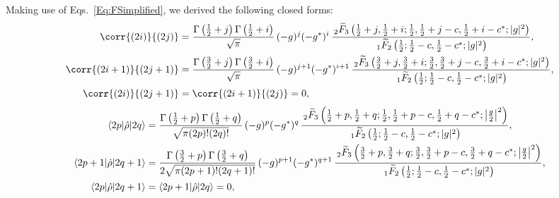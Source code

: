 \begin{widetext}
	Making use of Eqs.~\eqref{Eq:FSimplified}, we derived the following closed forms:
	\begin{subequations}\label{Eq:CorrijNoF}
		\begin{align}
		\corr{(2i)}{(2j)}
		&=
		\frac{\Gamma\left(\frac{1}{2}+j\right)\Gamma\left(\frac{1}{2}+i\right)}{\sqrt{\pi}}\,
		(-g)^j(-g^*)^i\,
		\frac{\,_2\widetilde{F}_3\left(\frac{1}{2}+j,\frac{1}{2}+i;
			\frac{1}{2},\frac{1}{2}+j-c,\frac{1}{2}+i-c^*;|g|^2\right)}
		{\,_1\widetilde{F}_2\left(\frac{1}{2};\frac{1}{2}-c,\frac{1}{2}-c^*;|g|^2\right)},
		\\
		\corr{(2i+1)}{(2j+1)}
		&=
		\frac{\Gamma\left(\frac{3}{2}+j\right)\Gamma\left(\frac{3}{2}+i\right)}{\sqrt{\pi}}\,
		(-g)^{j+1}(-g^*)^{i+1}\,
		\frac{\,_2\widetilde{F}_3\left(\frac{3}{2}+j,\frac{3}{2}+i;
			\frac{3}{2},\frac{3}{2}+j-c,\frac{3}{2}+i-c^*;|g|^2\right)}
		{\,_1\widetilde{F}_2\left(\frac{1}{2};\frac{1}{2}-c,\frac{1}{2}-c^*;|g|^2\right)},
		\\
		\corr{(2i)}{(2j+1)}&=\corr{(2i+1)}{(2j)}=0,
		\end{align}
	\end{subequations}
	\begin{subequations}\label{Eq:RhopqNoF}
		\begin{align}
		\braket{2p|\hat{\rho}|2q}
		&=\frac{\Gamma\left(\frac{1}{2}+p\right)\Gamma\left(\frac{1}{2}+q\right)}{\sqrt{\pi(2p)!(2q)!}}\,
		(-g)^p(-g^*)^q\,
		\frac{\,_2\widetilde{F}_3\left(\frac{1}{2}+p,\frac{1}{2}+q;
			\frac{1}{2},\frac{1}{2}+p-c,\frac{1}{2}+q-c^*;\left|\frac{g}{2}\right|^2\right)}
		{\,_1\widetilde{F}_2\left(\frac{1}{2};\frac{1}{2}-c,\frac{1}{2}-c^*;|g|^2\right)},
		\\
		\braket{2p+1|\hat{\rho}|2q+1}
		&=\frac{\Gamma\left(\frac{3}{2}+p\right)\Gamma\left(\frac{3}{2}+q\right)}{2\sqrt{\pi(2p+1)!(2q+1)!}}\,
		(-g)^{p+1}(-g^*)^{q+1}\,
		\frac{\,_2\widetilde{F}_3\left(\frac{3}{2}+p,\frac{3}{2}+q;
			\frac{3}{2},\frac{3}{2}+p-c,\frac{3}{2}+q-c^*;\left|\frac{g}{2}\right|^2\right)}
		{\,_1\widetilde{F}_2\left(\frac{1}{2};\frac{1}{2}-c,\frac{1}{2}-c^*;|g|^2\right)},
		\\
		\braket{2p|\hat{\rho}|2q+1}&=\braket{2p+1|\hat{\rho}|2q}=0,
		\end{align}
	\end{subequations}
\end{widetext}

